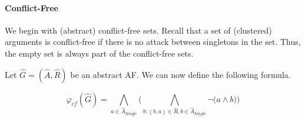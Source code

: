 \paragraph{Conflict-Free} We begin with (abstract) conflict-free sets. Recall that a set of (clustered) arguments is conflict-free if there is no attack between singletons in the set. Thus, the empty set is always part of the conflict-free sets.
\begin{definition}
    Let $\hat{G}=(\hat{A},\hat{R})$ be an abstract AF. We can now define the following formula.
    \begin{center}
        \[ \varphi_{cf}(\hat{G}) =
        \bigwedge_{a \in \hat{A}_{\mathit{Single}}} \bigl( \bigwedge_{b:(b,a)\in \hat{R}, b \in \hat{A}_{\mathit{Single}}} \lnot \bigl( a \wedge b \bigl) \bigl)
        \]
    \end{center}
    \label{def:booleanFormulaConflictFree}
\end{definition}


